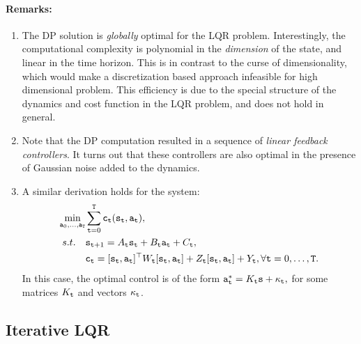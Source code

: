 \paragraph{Remarks:}
\begin{enumerate}
  \item The DP solution is \emph{globally} optimal for the LQR problem. Interestingly, the computational complexity is polynomial in the \textit{dimension} of the state, and linear in the time horizon. This is in contrast to the curse of dimensionality, which would make a discretization based approach infeasible for high dimensional problem. This efficiency is due to the special structure of the dynamics and cost function in the LQR problem, and does not hold in general.
  \item Note that the DP computation resulted in a sequence of \textit{linear feedback controllers}. It turns out that these controllers are also optimal in the presence of Gaussian noise added to the dynamics.
  \item A similar derivation holds for the system:
  \begin{equation*}\label{eq:lqr_full}
    \begin{split}
        \min_{{\tt a}_0,\dots,{\tt a}_{{\tt T}}} & \sum_{{\tt t}=0}^{\tt T} {\tt c}_{\tt t}({\tt s}_{\tt t}, {\tt a}_{\tt t}), \\
        s.t. \quad & {{\tt s}_{{\tt t}+1}} = A_{\tt t} {\tt s}_{\tt t} + B_{\tt t} {\tt a}_{\tt t} + C_{\tt t}, \\
        & {\tt c}_{\tt t} = [{\tt s}_{\tt t}, {\tt a}_{\tt t}]^\top W_{\tt t} [{\tt s}_{\tt t}, {\tt a}_{\tt t}] + Z_{\tt t} [{\tt s}_{\tt t}, {\tt a}_{\tt t}] + Y_{\tt t}, \forall {\tt t}=0,\dots,{\tt T}.
    \end{split}
\end{equation*}
In this case, the optimal control is of the form 
${\tt a}_{\tt t}^* = K_{\tt t} {\tt s} + \kappa_{\tt t}, $ for some matrices $K_{\tt t}$ and vectors  $\kappa_{\tt t}$.
\end{enumerate}


\subsection{Iterative LQR}


